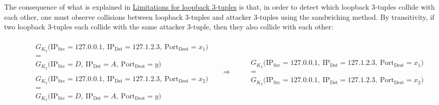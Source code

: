 \documentclass{report}
\begin{document}
The consequence of what is explained in \hyperlink{limitations}{Limitations for loopback 3-tuples} is that, in order to detect which loopback 3-tuples collide with each other, one must observe \alert{collisions between loopback 3-tuples and attacker 3-tuples} using the sandwiching method. By transitivity, if two loopback 3-tuples each collide with the same attacker 3-tuple, then they also collide with each other:

\begin{center}
\begin{adjustbox}{scale=0.9}
  \begin{minipage}{1.1\textwidth}
    \[
\begin{aligned}
&
\begin{aligned}
& \begin{array}{c}
G_{K_2}\bigl(\text{IP}_{\text{Src}} = 127.0.0.1,\ \text{IP}_{\text{Dst}} = 127.1.2.3,\ \text{Port}_{\text{Dest}} = x_1 \bigr) \\[0.3em]
= \\[0.3em]
G_{K_2}\bigl(\text{IP}_{\text{Src}} = D,\ \text{IP}_{\text{Dst}} = A,\ \text{Port}_{\text{Dest}} = y \bigr)
\end{array}
\\[1em]
& \begin{array}{c}
G_{K_2}\bigl(\text{IP}_{\text{Src}} = 127.0.0.1,\ \text{IP}_{\text{Dst}} = 127.1.2.3,\ \text{Port}_{\text{Dest}} = x_2 \bigr) \\[0.3em]
= \\[0.3em]
G_{K_2}\bigl(\text{IP}_{\text{Src}} = D,\ \text{IP}_{\text{Dst}} = A,\ \text{Port}_{\text{Dest}} = y \bigr)
\end{array}
\end{aligned}
\quad \Longrightarrow \quad
\begin{aligned}
& \begin{array}{c}
G_{K_2}\bigl(\text{IP}_{\text{Src}} = 127.0.0.1,\ \text{IP}_{\text{Dst}} = 127.1.2.3,\ \text{Port}_{\text{Dest}} = x_1 \bigr) \\[0.3em]
= \\[0.3em]
G_{K_2}\bigl(\text{IP}_{\text{Src}} = 127.0.0.1,\ \text{IP}_{\text{Dst}} = 127.1.2.3,\ \text{Port}_{\text{Dest}} = x_2 \bigr)
\end{array}
\end{aligned}
\end{aligned}
\]
  \end{minipage}
\end{adjustbox}
\end{center}
\end{document}
